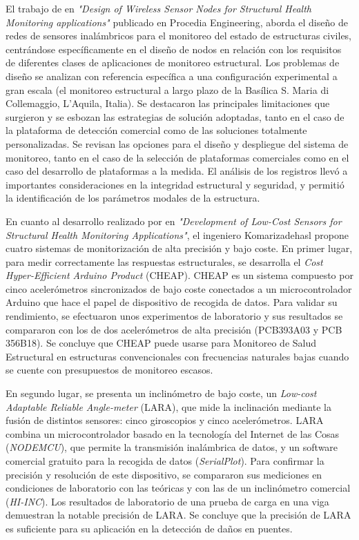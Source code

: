El trabajo de \cite{federici2014design} en \textit{"Design of Wireless Sensor Nodes for Structural Health Monitoring applications"} publicado en Procedia Engineering, aborda el diseño de redes de sensores inalámbricos para el monitoreo del estado de estructuras civiles, centrándose específicamente en el diseño de nodos en relación con los requisitos de diferentes clases de aplicaciones de monitoreo estructural.
Los problemas de diseño se analizan con referencia específica a una configuración experimental a gran escala (el monitoreo estructural a largo plazo de la Basílica S. Maria di Collemaggio, L'Aquila, Italia). Se destacaron las principales limitaciones que surgieron y se esbozan las estrategias de solución adoptadas, tanto en el caso de la plataforma de detección comercial como de las soluciones totalmente personalizadas. Se revisan las opciones para el diseño y despliegue del sistema de monitoreo, tanto en el caso de la selección de plataformas comerciales como en el caso del desarrollo de plataformas a la medida. El análisis de los registros llevó a importantes consideraciones en la integridad estructural y seguridad, y permitió la identificación de los parámetros modales de la estructura.

En cuanto al desarrollo realizado por \cite{komarizadehasl2022development} en \textit{"Development of Low-Cost Sensors for Structural Health Monitoring Applications"}, el ingeniero Komarizadehasl propone cuatro sistemas de monitorización de alta precisión y bajo coste.
En primer lugar, para medir correctamente las respuestas estructurales, se desarrolla el \textit{Cost Hyper-Efficient Arduino Product} (CHEAP). CHEAP es un sistema compuesto por cinco acelerómetros sincronizados de bajo coste conectados a un microcontrolador Arduino que hace el papel de dispositivo de recogida de datos. Para validar su rendimiento, se efectuaron unos experimentos de laboratorio y sus resultados se compararon con los de dos acelerómetros de alta precisión (PCB393A03 y PCB 356B18). Se concluye que CHEAP puede usarse para Monitoreo de Salud Estructural en estructuras convencionales con frecuencias naturales bajas cuando se cuente con presupuestos de monitoreo escasos. 

En segundo lugar, se presenta un inclinómetro de bajo coste, un \textit{Low-cost Adaptable Reliable Angle-meter} (LARA), que mide la inclinación mediante la fusión de distintos sensores: cinco giroscopios y cinco acelerómetros. LARA combina un microcontrolador basado en la tecnología del Internet de las Cosas (\textit{NODEMCU}), que permite la transmisión inalámbrica de datos, y un software comercial gratuito para la recogida de datos (\textit{SerialPlot}). Para confirmar la precisión y resolución de este dispositivo, se compararon sus mediciones en condiciones de laboratorio con las teóricas y con las de un inclinómetro comercial (\textit{HI-INC}). Los resultados de laboratorio de una prueba de carga en una viga demuestran la notable precisión de LARA. Se concluye que la precisión de LARA es suficiente para su aplicación en la detección de daños en puentes.

